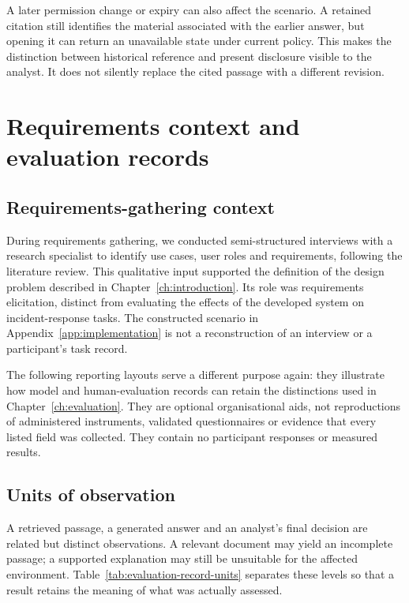 A later permission change or expiry can also affect the scenario. A retained citation still identifies the material associated with the earlier answer, but opening it can return an unavailable state under current policy. This makes the distinction between historical reference and present disclosure visible to the analyst. It does not silently replace the cited passage with a different revision.

\chapter{Requirements context and evaluation records}\label{app:instruments}

\section{Requirements-gathering context}
During requirements gathering, we conducted semi-structured interviews with a research specialist to identify use cases, user roles and requirements, following the literature review. This qualitative input supported the definition of the design problem described in Chapter~\ref{ch:introduction}. Its role was requirements elicitation, distinct from evaluating the effects of the developed system on incident-response tasks. The constructed scenario in Appendix~\ref{app:implementation} is not a reconstruction of an interview or a participant's task record.

The following reporting layouts serve a different purpose again: they illustrate how model and human-evaluation records can retain the distinctions used in Chapter~\ref{ch:evaluation}. They are optional organisational aids, not reproductions of administered instruments, validated questionnaires or evidence that every listed field was collected. They contain no participant responses or measured results.

\section{Units of observation}
A retrieved passage, a generated answer and an analyst's final decision are related but distinct observations. A relevant document may yield an incomplete passage; a supported explanation may still be unsuitable for the affected environment. Table~\ref{tab:evaluation-record-units} separates these levels so that a result retains the meaning of what was actually assessed.

